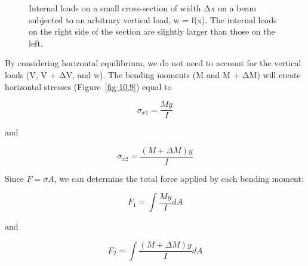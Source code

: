 \documentclass[
  letterpaper,
  DIV=11,
  numbers=noendperiod]{scrreprt}
\theoremstyle{definition}
\theoremstyle{remark}
\begin{document}
\begin{figure}


\caption{\label{fig-10.8}Internal loads on a small cross-section of
width Δx on a beam subjected to an arbitrary vertical load, w = f(x).
The internal loads on the right side of the section are slightly larger
than those on the left.}

\end{figure}%

By considering horizontal equilibrium, we do not need to account for the
vertical loads (V, V + ΔV, and w). The bending moments (M and M + ΔM)
will create horizontal stresses (Figure~\ref{fig-10.9}) equal to

\[
\sigma_{x 1}=\frac{M y}{I}
\]

and

\[
\sigma_{x 2}=\frac{(M+\Delta M) y}{I}
\]

Since \(F=\sigma A\), we can determine the total force applied by each
bending moment:

\[
F_1=\int \frac{M y}{I} d A
\]

and

\[
F_2=\int \frac{(M+\Delta M) y}{I} d A
\]
\end{document}
